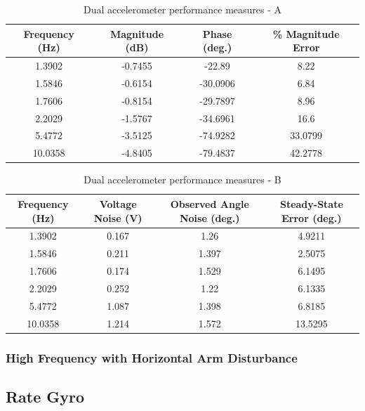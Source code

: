 \documentclass{article}
\theoremstyle{plain}
\theoremstyle{definition}
\theoremstyle{remark}
\begin{document}
\begin{table}
\begin{center}
    \begin{tabular}{|c|c|c|c|}
        \hline
        Frequency (Hz)  & Magnitude (dB) & Phase (deg.) & \% Magnitude Error \\ \hline
	1.3902  & -0.7455  & -22.89 & 8.22\\
       1.5846  & -0.6154  & -30.0906 & 6.84\\
	1.7606  & -0.8154 & -29.7897 & 8.96  \\
	2.2029 & -1.5767  & -34.6961 & 16.6   \\
	5.4772 & -3.5125  & -74.9282 & 33.0799  \\
	10.0358 & -4.8405 & -79.4837 & 42.2778 \\
        \hline
    \end{tabular}
\caption{Dual accelerometer performance measures - A}  
\label{dual_tableA}
\end{center}
\end{table}

\begin{table}
\begin{center}
    \begin{tabular}{|c|c|c|c|}
        \hline
        Frequency (Hz)  & Voltage Noise (V) & Observed Angle Noise (deg.) & Steady-State Error (deg.) \\ \hline
	1.3902  & 0.167  & 1.26 & 4.9211\\
       1.5846  & 0.211  & 1.397 & 2.5075 \\
	1.7606  & 0.174 & 1.529 & 6.1495  \\
	2.2029 & 0.252  & 1.22 & 6.1335   \\
	5.4772 & 1.087  & 1.398 & 6.8185  \\
	10.0358 & 1.214 & 1.572 & 13.5295 \\
        \hline
    \end{tabular}
\caption{Dual accelerometer performance measures - B}  
\label{dual_tableB}
\end{center}
\end{table}

\subsubsection{High Frequency with Horizontal Arm Disturbance}
\clearpage
\subsection{Rate Gyro}
\end{document}

